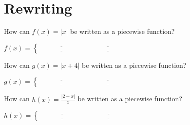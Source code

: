 \documentclass[12pt]{report}
\begin{document}
\section*{Rewriting}
How can $f(x)=|x|$ be written as a piecewise function?

\bigskip

$f(x)=\begin{cases} \underline{\hspace{1in}} &  \underline{\hspace{1in}} \\ \underline{\hspace{1in}} & \underline{\hspace{1in}} \end{cases}$

\bigskip
How can $g(x)=|x+4|$ be written as a piecewise function?

\bigskip

$g(x)=\begin{cases} \underline{\hspace{1in}} &  \underline{\hspace{1in}} \\ \underline{\hspace{1in}} & \underline{\hspace{1in}} \end{cases}$

\bigskip
How can $h(x)=\displaystyle\frac{|2-x|}{x}$ be written as a piecewise function?

\bigskip

$h(x)=\begin{cases} \underline{\hspace{1in}} &  \underline{\hspace{1in}} \\ \underline{\hspace{1in}} & \underline{\hspace{1in}} \end{cases}$
\end{document}

